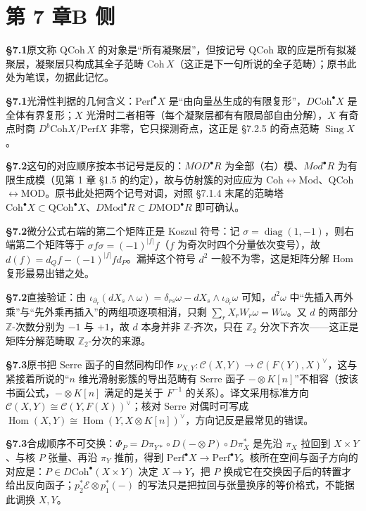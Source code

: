 \section*{第 7 章\quad B 侧}
\noindent\textbf{§7.1}\quad 原文称 $\mathrm{QCoh}\,X$ 的对象是“所有凝聚层”，但按记号 $\mathrm{QCoh}$ 取的应是所有拟凝聚层，凝聚层只构成其全子范畴 $\mathrm{Coh}\,X$（这正是下一句所说的全子范畴）；原书此处为笔误，勿据此记忆。\par\medskip
\noindent\textbf{§7.1}\quad 光滑性判据的几何含义：$\mathrm{Perf}^{\bullet}X$ 是“由向量丛生成的有限复形”，$D\mathrm{Coh}^{\bullet}X$ 是全体有界复形；$X$ 光滑时二者相等（每个凝聚层都有有限局部自由分解），$X$ 有奇点时商 $D^b\mathrm{Coh}X/\mathrm{Perf}X$ 非零，它只探测奇点，这正是 §7.2.5 的奇点范畴 $\operatorname{Sing}X$。\par\medskip
\noindent\textbf{§7.2}\quad 这句的对应顺序按本书记号是反的：$MOD^{\bullet}R$ 为全部（右）模、$Mod^{\bullet}R$ 为有限生成模（见第 1 章 §1.5 的约定），故与仿射簇的对应应为 Coh$\leftrightarrow$Mod、QCoh$\leftrightarrow$MOD。原书此处把两个记号对调，对照 §7.1.4 末尾的范畴塔 $\mathrm{Coh}^{\bullet}X\subset\mathrm{QCoh}^{\bullet}X$、$D\mathrm{Mod}^{\bullet}R\subset D\mathrm{MOD}^{\bullet}R$ 即可确认。\par\medskip
\noindent\textbf{§7.2}\quad 微分公式右端的第二个矩阵正是 Koszul 符号：记 $\sigma=\operatorname{diag}(1,-1)$，则右端第二个矩阵等于 $\sigma f\sigma=(-1)^{|f|}f$（$f$ 为奇次时四个分量依次变号），故 $d(f)=d_Qf-(-1)^{|f|}fd_P$。漏掉这个符号 $d^2$ 一般不为零，这是矩阵分解 Hom 复形最易出错之处。\par\medskip
\noindent\textbf{§7.2}\quad 直接验证：由 $\iota_{\partial_r}(dX_s\wedge\omega)=\delta_{rs}\omega-dX_s\wedge\iota_{\partial_r}\omega$ 可知，$d^2\omega$ 中“先插入再外乘”与“先外乘再插入”的两组项逐项相消，只剩 $\sum_rX_rW_r\omega=W\omega$。又 $d$ 的两部分 $\mathbb Z$-次数分别为 $-1$ 与 $+1$，故 $d$ 本身并非 $\mathbb Z$-齐次，只在 $\mathbb Z_2$ 分次下齐次——这正是矩阵分解范畴取 $\mathbb Z_2$-分次的来源。\par\medskip
\noindent\textbf{§7.3}\quad 原书把 Serre 函子的自然同构印作 $\nu_{X,Y}\colon\mathcal C(X,Y)\to\mathcal C(F(Y),X)^\vee$，这与紧接着所说的“$n$ 维光滑射影簇的导出范畴有 Serre 函子 $-\otimes K[n]$”不相容（按该书面公式，$-\otimes K[n]$ 满足的是关于 $F^{-1}$ 的关系）。译文采用标准方向 $\mathcal C(X,Y)\cong\mathcal C(Y,F(X))^\vee$；核对 Serre 对偶时可写成 $\operatorname{Hom}(X,Y)\cong\operatorname{Hom}(Y,X\otimes K[n])^\vee$，方向记反是最常见的错误。\par\medskip
\noindent\textbf{§7.3}\quad 合成顺序不可交换：$\Phi_P=D\pi_{Y*}\circ D(-\otimes P)\circ D\pi_X^*$ 是先沿 $\pi_X$ 拉回到 $X\times Y$、与核 $P$ 张量、再沿 $\pi_Y$ 推前，得到 $\mathrm{Perf}^{\bullet}X\to\mathrm{Perf}^{\bullet}Y$。核所在空间与函子方向的对应是：$P\in D\mathrm{Coh}^{\bullet}(X\times Y)$ 决定 $X\to Y$，把 $P$ 换成它在交换因子后的转置才给出反向函子；$p_2^*\mathcal E\otimes p_1^*(-)$ 的写法只是把拉回与张量换序的等价格式，不能据此调换 $X,Y$。\par\medskip
